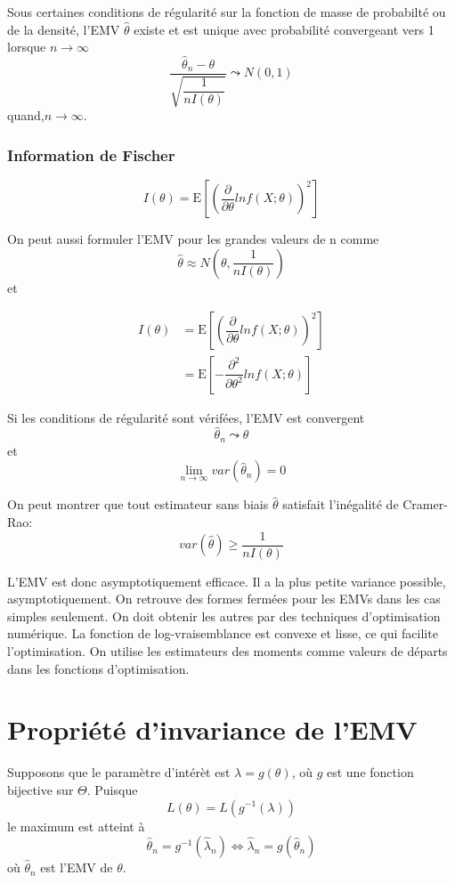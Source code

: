 Sous certaines conditions de régularité sur la fonction de masse de
probabilté ou de la densité, l'EMV \(\hat{\theta}\) existe et est unique
avec probabilité convergeant vers 1 lorsque \(n\rightarrow \infty\) \[
\dfrac{\hat{\theta}_n-\theta}{\sqrt{\dfrac{1}{nI(\theta)}}}\leadsto N(0,1)
\] quand,\(n\rightarrow\infty\).

\subsubsection*{Information de Fischer}\label{information-de-fischer}

\[
I(\theta)=\text{E}\left [\left (\dfrac{\partial}{\partial \theta}ln f(X;\theta)\right )^2\right ]
\]

On peut aussi formuler l'EMV pour les grandes valeurs de n comme \[
\hat{\theta}\approx N\left(\theta,\dfrac{1}{nI(\theta)}\right)
\] et

\begin{align*}
I(\theta)& =\text{E}\left [\left (\dfrac{\partial}{\partial \theta}ln f(X;\theta)\right )^2\right ]\\
& =\text{E}\left [-\dfrac{{\partial}^2}{\partial {\theta}^2}ln f(X;\theta)\right ]
\end{align*}

Si les conditions de régularité sont vérifées, l'EMV est convergent \[
\hat{\theta}_n\leadsto \theta
\] et \[
\lim_{n\rightarrow\infty} var(\hat{\theta}_n)=0
\]

On peut montrer que tout estimateur sans biais \(\hat{\theta}\)
satisfait l'inégalité de Cramer-Rao: \[
var(\hat{\theta}) \geq \dfrac{1}{nI(\theta)}
\]

L'EMV est donc asymptotiquement efficace. Il a la plus petite variance
possible, asymptotiquement. On retrouve des formes fermées pour les EMVs
dans les cas simples seulement. On doit obtenir les autres par des
techniques d'optimisation numérique. La fonction de log-vraisemblance
est convexe et lisse, ce qui facilite l'optimisation. On utilise les
estimateurs des moments comme valeurs de départs dans les fonctions
d'optimisation.

\section{Propriété d'invariance de l'EMV}\label{propriete-dinvariance-de-lemv}

Supposons que le paramètre d'intérèt est \(\lambda=g(\theta)\), où \(g\)
est une fonction bijective sur \(\Theta\). Puisque \[
L(\theta)=L(g^{-1}(\lambda))
\] le maximum est atteint à \[
\hat{\theta}_n=g^{-1}(\hat{\lambda}_n)\Leftrightarrow \hat{\lambda}_n=g(\hat{\theta}_n)
\] où \(\hat{\theta}_n\) est l'EMV de \(\theta\).

